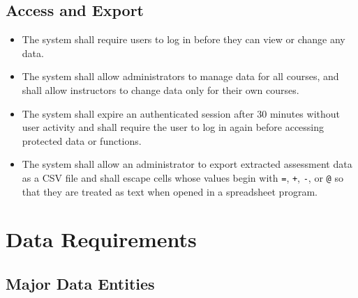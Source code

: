 \documentclass[12pt]{article}
\newcounter{reqnum} %
\begin{document}
\subsection*{Access and Export}
\begin{itemize}
\item[FR\refstepcounter{reqnum}\thereqnum \label{FR_Access_Login}:] The system shall require users to log in before they can view or change any data.
\item[FR\refstepcounter{reqnum}\thereqnum \label{FR_Access_Roles}:] The system shall allow administrators to manage data for all courses, and shall allow instructors to change data only for their own courses.
\item[FR\refstepcounter{reqnum}\thereqnum \label{FR_Access_Timeout}:] The system shall expire an authenticated session after 30 minutes without user activity and shall require the user to log in again before accessing protected data or functions.
\item[FR\refstepcounter{reqnum}\thereqnum \label{FR_Export_CSV}:] The system shall allow an administrator to export extracted assessment data as a CSV file and shall escape cells whose values begin with \texttt{=}, \texttt{+}, \texttt{-}, or \texttt{@} so that they are treated as text when opened in a spreadsheet program.
\end{itemize}


\section{Data Requirements} \label{sec_DataReqs}

\subsection{Major Data Entities}
\end{document}

